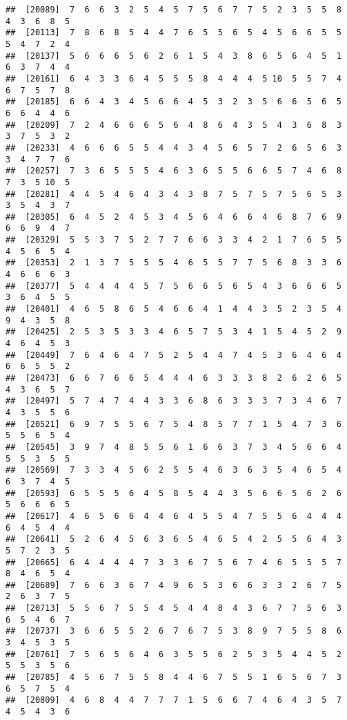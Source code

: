\documentclass[
]{book}
\begin{document}
\begin{verbatim}
##  [20089]  7  6  6  3  2  5  4  5  7  5  6  7  7  5  2  3  5  5  8  4  3  6  8  5
##  [20113]  7  8  6  8  5  4  4  7  6  5  5  6  5  4  5  6  6  5  5  5  4  7  2  4
##  [20137]  5  6  6  6  5  6  2  6  1  5  4  3  8  6  5  6  4  5  1  6  3  7  4  4
##  [20161]  6  4  3  3  6  4  5  5  5  8  4  4  4  5 10  5  5  7  4  6  7  5  7  8
##  [20185]  6  6  4  3  4  5  6  6  4  5  3  2  3  5  6  6  5  6  5  6  6  4  4  6
##  [20209]  7  2  4  6  6  6  5  6  4  8  6  4  3  5  4  3  6  8  3  3  7  5  3  2
##  [20233]  4  6  6  6  5  5  4  4  3  4  5  6  5  7  2  6  5  6  3  3  4  7  7  6
##  [20257]  7  3  6  5  5  5  4  6  3  6  5  5  6  6  5  7  4  6  8  7  3  5 10  5
##  [20281]  4  4  5  4  6  4  3  4  3  8  7  5  7  5  7  5  6  5  3  3  5  4  3  7
##  [20305]  6  4  5  2  4  5  3  4  5  6  4  6  6  4  6  8  7  6  9  6  6  9  4  7
##  [20329]  5  5  3  7  5  2  7  7  6  6  3  3  4  2  1  7  6  5  5  4  5  6  5  4
##  [20353]  2  1  3  7  5  5  5  4  6  5  5  7  7  5  6  8  3  3  6  4  6  6  6  3
##  [20377]  5  4  4  4  4  5  7  5  6  6  5  6  5  4  3  6  6  6  5  3  6  4  5  5
##  [20401]  4  6  5  8  6  5  4  6  6  4  1  4  4  3  5  2  3  5  4  9  4  3  5  8
##  [20425]  2  5  3  5  3  3  4  6  5  7  5  3  4  1  5  4  5  2  9  4  6  4  5  3
##  [20449]  7  6  4  6  4  7  5  2  5  4  4  7  4  5  3  6  4  6  4  6  6  5  5  2
##  [20473]  6  6  7  6  6  5  4  4  4  6  3  3  3  8  2  6  2  6  5  4  3  6  5  7
##  [20497]  5  7  4  7  4  4  3  3  6  8  6  3  3  3  7  3  4  6  7  4  3  5  5  6
##  [20521]  6  9  7  5  5  6  7  5  4  8  5  7  7  1  5  4  7  3  6  5  5  6  5  4
##  [20545]  3  9  7  4  8  5  5  6  1  6  6  3  7  3  4  5  6  6  4  5  5  3  5  5
##  [20569]  7  3  3  4  5  6  2  5  5  4  6  3  6  3  5  4  6  5  4  6  3  7  4  5
##  [20593]  6  5  5  5  6  4  5  8  5  4  4  3  5  6  6  5  6  2  6  5  6  6  6  5
##  [20617]  4  6  5  6  6  4  4  6  4  5  5  4  7  5  5  6  4  4  4  6  4  5  4  4
##  [20641]  5  2  6  4  5  6  3  6  5  4  6  5  4  2  5  5  6  4  3  5  7  2  3  5
##  [20665]  6  4  4  4  4  7  3  3  6  7  5  6  7  4  6  5  5  5  7  8  4  6  5  4
##  [20689]  7  6  6  3  6  7  4  9  6  5  3  6  6  3  3  2  6  7  5  2  6  3  7  5
##  [20713]  5  5  6  7  5  5  4  5  4  4  8  4  3  6  7  7  5  6  3  6  5  4  6  7
##  [20737]  3  6  6  5  5  2  6  7  6  7  5  3  8  9  7  5  5  8  6  3  4  5  3  5
##  [20761]  7  5  6  5  6  4  6  3  5  5  6  2  5  3  5  4  4  5  2  5  5  3  5  6
##  [20785]  4  5  6  7  5  5  8  4  4  6  7  5  5  1  6  5  6  7  3  6  5  7  5  4
##  [20809]  4  6  8  4  4  7  7  7  1  5  6  6  7  4  6  4  3  5  7  4  5  4  3  6

\end{verbatim}
\end{document}
